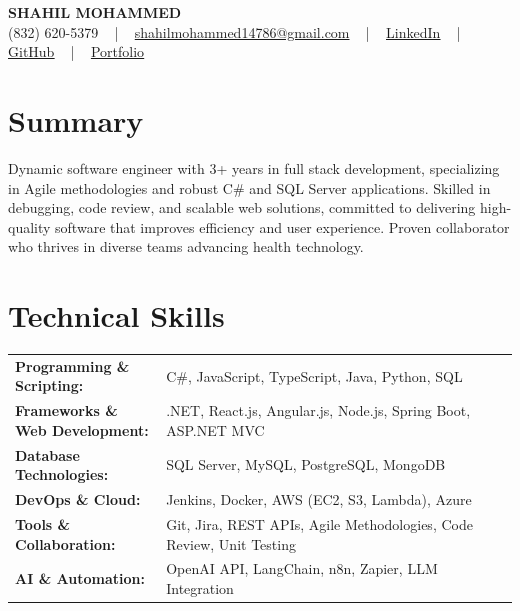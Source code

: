 \documentclass[letterpaper,11pt]{article}
\begin{document}
\begin{center}
    {\fontsize{14pt}{12pt}\selectfont \textbf{\MakeUppercase{Shahil Mohammed}}}\\ \vspace{2pt}
    \fontsize{10pt}{12pt}\selectfont (832) 620-5379 ~ | ~ \href{mailto:shahilmohammed14786@gmail.com}{shahilmohammed14786@gmail.com} ~ | ~  
    \href{https://www.linkedin.com/in/shahil-mohammed-9652931a1/}{\color{blue}\underline{LinkedIn}}  ~ | ~ 
    \href{https://github.com/freakbeast14}{\color{blue}\underline{GitHub}} ~ | ~ 
    \href{https://shahil-mohammed.netlify.app/}{\color{blue}\underline{Portfolio}}
    \vspace{-8pt}
\end{center}

\section{Summary}
\fontsize{9pt}{10pt}\selectfont
Dynamic software engineer with 3+ years in full stack development, specializing in Agile methodologies and robust C\# and SQL Server applications. Skilled in debugging, code review, and scalable web solutions, committed to delivering high-quality software that improves efficiency and user experience. Proven collaborator who thrives in diverse teams advancing health technology.

 \vspace{-5pt}
 
\section{Technical Skills}
        \vspace{-14pt}
        \begin{table}[h]
            \fontsize{9pt}{10pt}\selectfont
            \begin{tabular}{p{0.3\linewidth} p{0.7\linewidth}}
                \textbf{Programming \& Scripting:} & C\#, JavaScript, TypeScript, Java, Python, SQL \\
                \textbf{Frameworks \& Web Development:} & .NET, React.js, Angular.js, Node.js, Spring Boot, ASP.NET MVC \\
                \textbf{Database Technologies:} & SQL Server, MySQL, PostgreSQL, MongoDB \\
                \textbf{DevOps \& Cloud:} & Jenkins, Docker, AWS (EC2, S3, Lambda), Azure \\
                \textbf{Tools \& Collaboration:} & Git, Jira, REST APIs, Agile Methodologies, Code Review, Unit Testing \\
                \textbf{AI \& Automation:} & OpenAI API, LangChain, n8n, Zapier, LLM Integration \\
            \end{tabular}
        \end{table}
 \vspace{-15pt}
 
\end{document}
